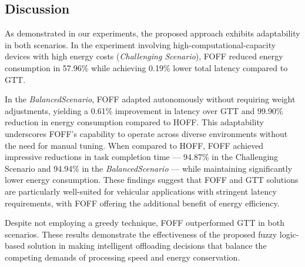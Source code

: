\documentclass[iicol]{sn-jnl}
\begin{document}
\subsection{Discussion}
As demonstrated in our experiments, the proposed approach exhibits adaptability in both scenarios. In the experiment involving high-computational-capacity devices with high energy costs (\textit{Challenging Scenario}), FOFF reduced energy consumption in 57.96\% while achieving 0.19\% lower total latency compared to GTT.

In the \textit{BalancedScenario}, FOFF adapted autonomously without requiring weight adjustments, yielding a 0.61\% improvement in latency over GTT and 99.90\% reduction in energy consumption compared to HOFF. This adaptability underscores FOFF's capability to operate across diverse environments without the need for manual tuning. When compared to HOFF, FOFF achieved impressive reductions in task completion time --- 94.87\% in the Challenging Scenario and 94.94\% in the \textit{BalancedScenario} --- while maintaining significantly lower energy consumption. These findings suggest that FOFF and GTT solutions are particularly well-suited for vehicular applications with stringent latency requirements, with FOFF offering the additional benefit of energy efficiency.

Despite not employing a greedy technique, FOFF outperformed GTT in both scenarios. These results demonstrate the effectiveness of the proposed fuzzy logic-based solution in making intelligent offloading decisions that balance the competing demands of processing speed and energy conservation.
\end{document}
